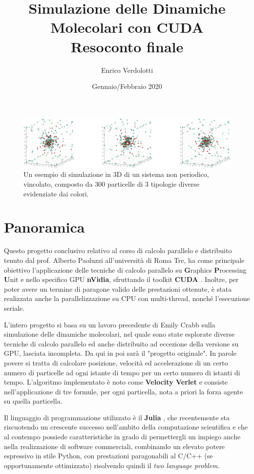 \documentclass[11pt, a4paper]{article}
\title{Simulazione delle Dinamiche Molecolari con CUDA\\ 
       \Large Resoconto finale}
\author{Enrico Verdolotti}
\date{Gennaio/Febbraio 2020}
\begin{document}
\maketitle


\begin{figure}[h]
\centering
\includegraphics[width=\textwidth]{images/spritesheet3d.png}
\caption{Un esempio di simulazione in 3D di un sistema non periodico, vincolato, composto da 300 particelle di 3 tipologie diverse evidenziate dai colori.}
\label{sprite3d}
\end{figure}
\section*{Panoramica}
Questo progetto conclusivo relativo al corso di calcolo parallelo e distribuito tenuto dal prof. Alberto Paoluzzi all'università di Roma Tre, ha come principale obiettivo l'applicazione delle tecniche di calcolo parallelo su \textbf{G}raphics \textbf{P}rocessing \textbf{U}nit e nello specifico GPU \textbf{nVidia}, sfruttando il toolkit \textbf{CUDA} \cite{CUDA}. Inoltre, per poter avere un termine di paragone valido delle prestazioni ottenute, è stata realizzata anche la parallelizzazione su CPU con multi-thread, nonché l'esecuzione seriale.

L'intero progetto si basa su un lavoro precedente di Emily Crabb \cite{crabb} sulla simulazione delle dinamiche molecolari, nel quale sono state esplorate diverse tecniche di calcolo parallelo ed anche distribuito ad eccezione della versione su GPU, lasciata incompleta. Da qui in poi sarà il "progetto originale". In parole povere si tratta di calcolare posizione, velocità ed accelerazione di un certo numero di particelle ad ogni istante di tempo per un certo numero di istanti di tempo. L'algoritmo implementato è noto come \textbf{Velocity Verlet} \cite{verlet} e consiste nell'applicazione di tre formule, per ogni particella, nota a priori la forza agente su quella particella. 

Il linguaggio di programmazione utilizzato è il \textbf{Julia} \cite{julia}, che recentemente sta riscuotendo un crescente successo nell'ambito della computazione scientifica e che al contempo possiede caratteristiche in grado di permettergli un impiego anche nella realizzazione di software commerciali, combinando un elevato potere espressivo in stile Python, con prestazioni paragonabili al C/C++ (se opportunamente ottimizzato) risolvendo quindi il \emph{two language problem}.
\end{document}
